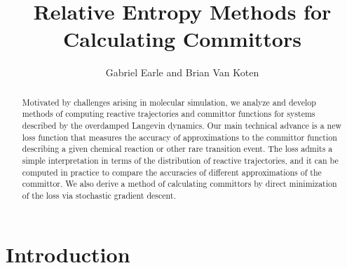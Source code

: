 \documentclass[reqno]{amsart}
\title{Relative Entropy Methods for Calculating Committors}
\author{Gabriel Earle and Brian Van Koten}
\newcommand{\1}{\mathds{1}}
\theoremstyle{definition}
\theoremstyle{remark}
\begin{document}
\maketitle

\begin{abstract}
  Motivated by challenges arising in molecular simulation, we analyze and develop methods of computing reactive trajectories and committor functions for systems described by the overdamped Langevin dynamics. 
  Our main technical advance is a new loss function that measures the accuracy of approximations to the committor function describing a given chemical reaction or other rare transition event. The loss admits a simple interpretation in terms of the distribution of reactive trajectories, and it can be computed in practice to compare the accuracies of different approximations of the committor. We also derive a method of calculating committors by direct minimization of the loss via stochastic gradient descent.
\end{abstract}

\section{Introduction}
\end{document}
